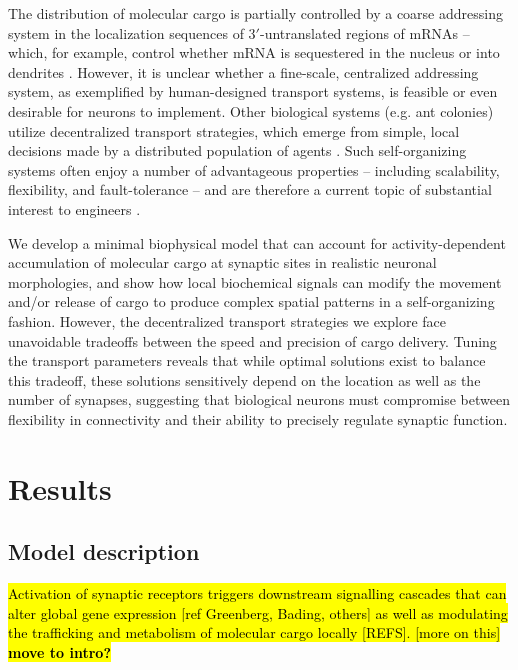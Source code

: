 \documentclass[11pt]{wlpeerj}
\begin{document}
The distribution of molecular cargo is partially controlled by a coarse addressing system in the localization sequences of 3$'$-untranslated regions of mRNAs -- which, for example, control whether mRNA is sequestered in the nucleus or into dendrites \citep{Andreassi2009}.
However, it is unclear whether a fine-scale, centralized addressing system, as exemplified by human-designed transport systems, is feasible or even desirable for neurons to implement.
Other biological systems (e.g. ant colonies) utilize decentralized transport strategies, which emerge from simple, local decisions made by a distributed population of agents \citep{Deneubourg_1990}.
Such self-organizing systems often enjoy a number of advantageous properties -- including scalability, flexibility, and fault-tolerance -- and are therefore a current topic of substantial interest to engineers \citep{Werfel2014,Rubenstein2014}.

We develop a minimal biophysical model that can account for activity-dependent accumulation of molecular cargo at synaptic sites in realistic neuronal morphologies, and show how local biochemical signals can modify the movement and/or release of cargo to produce complex spatial patterns in a self-organizing fashion.
However, the decentralized transport strategies we explore face unavoidable tradeoffs between the speed and precision of cargo delivery.
Tuning the transport parameters reveals that while optimal solutions exist to balance this tradeoff, these solutions sensitively depend on the location as well as the number of synapses, suggesting that biological neurons must compromise between flexibility in connectivity and their ability to precisely regulate synaptic function.


\section*{Results}

\subsection*{Model description}

\hl{Activation of synaptic receptors triggers downstream signalling cascades that can alter global gene expression [ref Greenberg, Bading, others] as well as modulating the trafficking and metabolism of molecular cargo locally [REFS]. [more on this] \textbf{move to intro?}}
\end{document}
